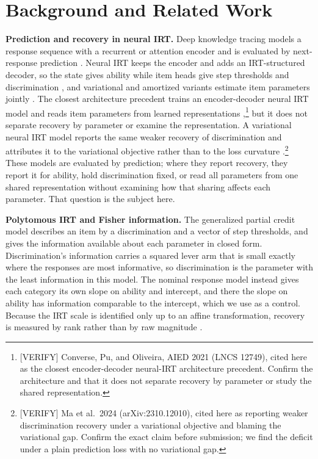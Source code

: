 \documentclass[twocolumn,10pt]{article}
\begin{document}
\section{Background and Related Work}
\textbf{Prediction and recovery in neural IRT.} Deep knowledge tracing models a response
sequence with a recurrent or attention encoder and is evaluated by next-response prediction
\citep{piech2015,zhang2017,pandey2019}. Neural IRT keeps the encoder and adds an
IRT-structured decoder, so the state gives ability while item heads give step thresholds
and discrimination \citep{yeung2019}, and variational and amortized variants estimate item
parameters jointly \citep{wu2020,tsutsumi2024}. The closest architecture precedent trains
an encoder-decoder neural IRT model and reads item parameters from learned
representations \citep{converse2021},\footnote{[VERIFY] Converse, Pu, and Oliveira, AIED
2021 (LNCS 12749), cited here as the closest encoder-decoder neural-IRT architecture
precedent. Confirm the architecture and that it does not separate recovery by parameter or
study the shared representation.} but it does not separate recovery by parameter or examine
the representation. A variational neural IRT model reports the same weaker recovery of
discrimination and attributes it to the variational objective rather than to the loss
curvature \citep{ma2024}.\footnote{[VERIFY] Ma et al.\ 2024 (arXiv:2310.12010), cited here
as reporting weaker discrimination recovery under a variational objective and blaming the
variational gap. Confirm the exact claim before submission; we find the deficit under a
plain prediction loss with no variational gap.} These models are evaluated by prediction;
where they report recovery, they report it for ability, hold discrimination fixed, or read
all parameters from one shared representation without examining how that sharing affects
each parameter. That question is the subject here.

\textbf{Polytomous IRT and Fisher information.} The generalized partial credit model
\citep{vanderlinden1997,embretson2000} describes an item by a discrimination and a vector
of step thresholds, and gives the information available about each parameter in closed
form. Discrimination's information carries a squared lever arm that is small exactly where
the responses are most informative, so discrimination is the parameter with the least
information in this model. The nominal response model \citep{bock1972} instead gives each
category its own slope on ability and intercept, and there the slope on ability has
information comparable to the intercept, which we use as a control. Because the IRT scale is
identified only up to an affine transformation, recovery is measured by rank rather than by
raw magnitude \citep{embretson2000}.
\end{document}
